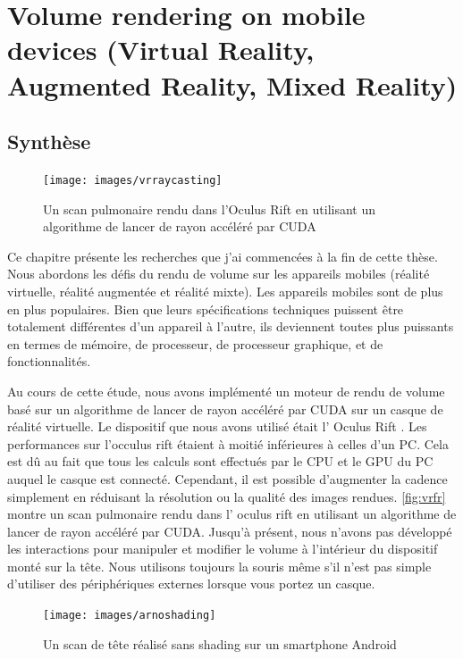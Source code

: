 \chapter{Volume rendering on mobile devices (Virtual Reality, Augmented Reality, Mixed Reality) }
\label{mixedReality}


\section{Synthèse}

\begin{figure}
\centering
\texttt{[image: images/vrraycasting]}
\caption{Un scan pulmonaire rendu dans l'Oculus Rift en utilisant un algorithme de lancer de rayon accéléré par CUDA}
\label{fig:vrfr}
\end{figure}
Ce chapitre présente les recherches que j'ai commencées à la fin de cette thèse.
Nous abordons les défis du rendu de volume sur les appareils mobiles (réalité virtuelle, réalité augmentée et réalité mixte). Les appareils mobiles sont de plus en plus populaires. Bien que leurs spécifications techniques puissent être totalement différentes d’un appareil à l’autre, ils deviennent toutes plus puissants en termes de mémoire, de processeur, de processeur graphique, et de fonctionnalités.

Au cours de cette étude, nous avons implémenté un moteur de rendu de volume basé sur un algorithme de lancer de rayon accéléré par CUDA sur un casque de réalité virtuelle. Le dispositif que nous avons utilisé était l' Oculus Rift \cite{oculus}. Les performances sur  l'occulus rift étaient à moitié inférieures à celles d'un PC. Cela est dû au fait que tous les calculs sont effectués par le CPU et le GPU du PC auquel le casque est connecté. Cependant, il est possible d’augmenter la cadence simplement en réduisant la résolution ou la qualité des images rendues. \autoref{fig:vrfr} montre un scan pulmonaire rendu dans l' oculus rift en utilisant un algorithme de lancer de rayon accéléré par CUDA. Jusqu'à présent, nous n'avons pas développé les interactions pour manipuler et modifier le volume à l'intérieur du dispositif monté sur la tête. Nous utilisons toujours la souris même s'il n'est pas simple d'utiliser des périphériques externes lorsque vous portez un casque.



\begin{figure}
\centering
\texttt{[image: images/arnoshading]}
\caption{Un scan de tête réalisé sans shading sur un smartphone Android }
\label{fig:arnoshadingfr}
\end{figure}

